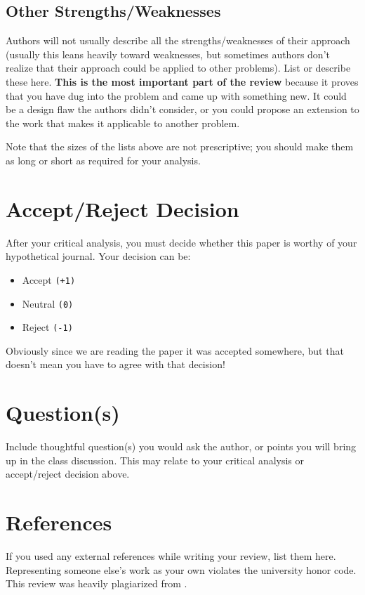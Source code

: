 \documentclass{proc}
\begin{document}
\subsection{Other Strengths/Weaknesses}

Authors will not usually describe all the strengths/weaknesses of their approach (usually this leans heavily toward weaknesses, but sometimes authors don't realize that their approach could be applied to other problems). List or describe these here. \textbf{This is the most important part of the review} because it proves that you have dug into the problem and came up with something new. It could be a design flaw the authors didn't consider, or you could propose an extension to the work that makes it applicable to another problem.

Note that the sizes of the lists above are not prescriptive; you should make them as long or short as required for your analysis.

\section{Accept/Reject Decision}
After your critical analysis, you must decide whether this paper is worthy of your hypothetical journal. Your decision can be:
\begin{itemize}
\item Accept \texttt{(+1)}
\item Neutral \texttt{(0)}
\item Reject \texttt{(-1)}
\end{itemize}
Obviously since we are reading the paper it was accepted somewhere, but that doesn’t mean you have to agree with that decision!

\section{Question(s)}
Include thoughtful question(s) you would ask the author, or points you will bring up in the class discussion. This may relate to your critical analysis or accept/reject decision above.

\section{References}
If you used any external references while writing your review, list them here. Representing someone else's work as your own violates the university honor code. This review was heavily plagiarized from \cite{bigdata}.
\end{document}
